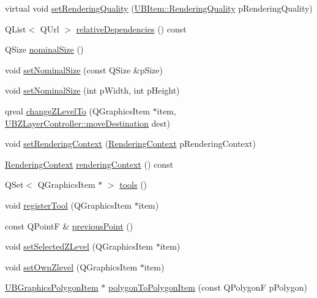 \begin{DoxyCompactItemize}
\item 
virtual void \hyperlink{class_u_b_graphics_scene_a3fac42724b4c9d395698cc7e16f902ab}{set\-Rendering\-Quality} (\hyperlink{class_u_b_item_a4d073757053cafbe4f26c17ea1224d53}{U\-B\-Item\-::\-Rendering\-Quality} p\-Rendering\-Quality)
\item 
Q\-List$<$ Q\-Url $>$ \hyperlink{class_u_b_graphics_scene_a601351bf55e81a30a79943a4080f5978}{relative\-Dependencies} () const 
\item 
Q\-Size \hyperlink{class_u_b_graphics_scene_aec88131e2343abb3e86dc5efcd8de622}{nominal\-Size} ()
\item 
void \hyperlink{class_u_b_graphics_scene_a30821700452b29351caedb551fc1e834}{set\-Nominal\-Size} (const Q\-Size \&p\-Size)
\item 
void \hyperlink{class_u_b_graphics_scene_a8f4bb049a0411b5b0239e50342e57db3}{set\-Nominal\-Size} (int p\-Width, int p\-Height)
\item 
qreal \hyperlink{class_u_b_graphics_scene_a5059be753d44af966649115ae9ebfd08}{change\-Z\-Level\-To} (Q\-Graphics\-Item $\ast$item, \hyperlink{class_u_b_z_layer_controller_aaea26acb88959955623736b3127f96b3}{U\-B\-Z\-Layer\-Controller\-::move\-Destination} dest)
\item 
void \hyperlink{class_u_b_graphics_scene_a55dad0b5d2cacfc62edb5bee3bf0a0fc}{set\-Rendering\-Context} (\hyperlink{class_u_b_graphics_scene_a58c07654e56235641dd3aeb92ac24130}{Rendering\-Context} p\-Rendering\-Context)
\item 
\hyperlink{class_u_b_graphics_scene_a58c07654e56235641dd3aeb92ac24130}{Rendering\-Context} \hyperlink{class_u_b_graphics_scene_a430675c3c5406f64129e4cdefb379861}{rendering\-Context} () const 
\item 
Q\-Set$<$ Q\-Graphics\-Item $\ast$ $>$ \hyperlink{class_u_b_graphics_scene_a18e33c67e244cacb4fbf5fd0abda84cf}{tools} ()
\item 
void \hyperlink{class_u_b_graphics_scene_a8c3c528109db216ef85eb8d960b01805}{register\-Tool} (Q\-Graphics\-Item $\ast$item)
\item 
const Q\-Point\-F \& \hyperlink{class_u_b_graphics_scene_a5c4103129de7ab6a38bf7912cb07643e}{previous\-Point} ()
\item 
void \hyperlink{class_u_b_graphics_scene_a07ce06fdfce6141bbb1c709eb1c48974}{set\-Selected\-Z\-Level} (Q\-Graphics\-Item $\ast$item)
\item 
void \hyperlink{class_u_b_graphics_scene_a96bcf498668cc92b4d7c4df04f86a8bc}{set\-Own\-Zlevel} (Q\-Graphics\-Item $\ast$item)
\item 
\hyperlink{class_u_b_graphics_polygon_item}{U\-B\-Graphics\-Polygon\-Item} $\ast$ \hyperlink{class_u_b_graphics_scene_add209174dcc6cedf595fab2fb2409012}{polygon\-To\-Polygon\-Item} (const Q\-Polygon\-F p\-Polygon)
\end{DoxyCompactItemize}
